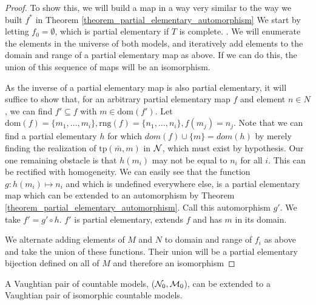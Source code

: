 \begin{proof}
To show this, we will build a map in a way very similar to the way we built \(f^*\) in Theorem \ref{theorem_partial_elementary_automorphism}
We start by letting \(f_0 = \emptyset\), which is partial elementary if \(T\) is complete. . 
We will enumerate the elements in the universe of both models, and iteratively add elements to the domain and range of a partial elementary map as above.
If we can do this, the union of this sequence of maps will be an isomorphism.

As the inverse of a partial elementary map is also partial elementary, it will suffice to show that, for an arbitrary  partial elementary map \(f\) and element \(n \in N\), we can find \(f'\subseteq f\) with \(m \in \text{dom}(f')\).
Let \(\text{dom}(f) = \{m_1, \ldots, m_i\}, \text{rng}(f) = \{n_1, \ldots, n_i\}, f(m_j) = n_j\).
Note that we can find a partial elementary \(h\) for which \(dom(f) \cup \{m\} =  dom(h)\) by merely finding the realization of \(\text{tp}(\bar{m}, m)\) in \(\mathcal{N}\), which must exist by hypothesis.
Our one remaining obstacle is that \(h(m_i)\) may not be equal to \(n_i\) for all \(i\). 
This can be rectified with homogeneity. 
We can easily see that the function \(g: h(m_i) \mapsto n_i\) and which is undefined everywhere else, is a partial elementary map which can be extended to an automorphism by Theorem \ref{theorem_partial_elementary_automorphism}. 
Call this automorphism \(g'\). 
We take \(f' = g' \circ h\).
\(f'\) is partial elementary, extends \(f\) and has \(m\) in its domain.   

We alternate adding elements of \(M\) and \(N\) to domain and range of \(f_i\) as above and take the union of these functions.
Their union will be a partial elementary bijection defined on all of \(M\) and therefore an isomorphism
\end{proof}

\begin{theorem}\label{theorem_countable_isomorphic_vaughtian_pair}
A Vaughtian pair of countable models, (\(\mathcal{N}_0, \mathcal{M}_0\)), can be extended to a Vaughtian pair of isomorphic countable models.
\end{theorem}

